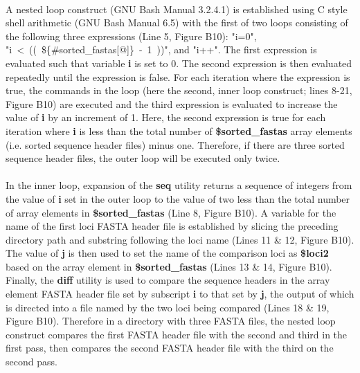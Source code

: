 \paragraph{} A nested loop construct (GNU Bash Manual 3.2.4.1) is established using C style shell arithmetic (GNU Bash Manual 6.5) with the first of two loops consisting of the following three expressions (Line 5, Figure B10): "i=0", \mbox{"i < (( \$\{\#sorted\_fastas[@]\} - 1 ))"}, and "i++".  The first expression is evaluated such that variable \textbf{i} is set to 0.  The second expression is then evaluated repeatedly until the expression is false.  For each iteration where the expression is true, the commands in the loop (here the second, inner loop construct; lines 8-21, Figure B10) are executed and the third expression is evaluated to increase the value of \textbf{i} by an increment of 1.  Here, the second expression is true for each iteration where \textbf{i} is less than the total number of \textbf{\$sorted\_fastas} array elements (i.e. sorted sequence header files) minus one.  Therefore, if there are three sorted sequence header files, the outer loop will be executed only twice.

\paragraph{} In the inner loop, expansion of the \textbf{seq} utility returns a sequence of integers from the value of \textbf{i} set in the outer loop to the value of two less than the total number of array elements in \textbf{\$sorted\_fastas} (Line 8, Figure B10).  A variable for the name of the first loci FASTA header file is established by slicing the preceding directory path and substring following the loci name (Lines 11 \& 12, Figure B10).  The value of \textbf{j} is then used to set the name of the comparison loci as \textbf{\$loci2} based on the array element in \textbf{\$sorted\_fastas} (Lines 13 \& 14, Figure B10).  Finally, the \textbf{diff} utility is used to compare the sequence headers in the array element FASTA header file set by subscript \textbf{i} to that set by \textbf{j}, the output of which is directed into a file named by the two loci being compared (Lines 18 \& 19, Figure B10).  Therefore in a directory with three FASTA files, the nested loop construct compares the first FASTA header file with the second and third in the first pass, then compares the second FASTA header file with the third on the second pass. 

\clearpage

